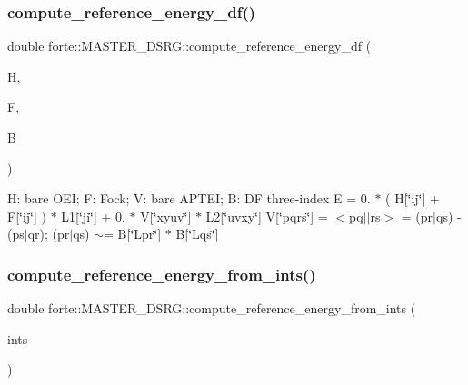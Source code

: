 \subsubsection{\texorpdfstring{compute\+\_\+reference\+\_\+energy\+\_\+df()}{compute\_reference\_energy\_df()}}
{\footnotesize\ttfamily double forte\+::\+M\+A\+S\+T\+E\+R\+\_\+\+D\+S\+R\+G\+::compute\+\_\+reference\+\_\+energy\+\_\+df (\begin{DoxyParamCaption}\item[{Blocked\+Tensor}]{H,  }\item[{Blocked\+Tensor}]{F,  }\item[{Blocked\+Tensor}]{B }\end{DoxyParamCaption})\hspace{0.3cm}{\ttfamily [protected]}}

H\+: bare O\+EI; F\+: Fock; V\+: bare A\+P\+T\+EI; B\+: DF three-\/index E = 0. $\ast$ ( H\mbox{[}\char`\"{}ij\char`\"{}\mbox{]} + F\mbox{[}\char`\"{}ij\char`\"{}\mbox{]} ) $\ast$ L1\mbox{[}\char`\"{}ji\char`\"{}\mbox{]} + 0. $\ast$ V\mbox{[}\char`\"{}xyuv\char`\"{}\mbox{]} $\ast$ L2\mbox{[}\char`\"{}uvxy\char`\"{}\mbox{]} V\mbox{[}\char`\"{}pqrs\char`\"{}\mbox{]} = $<$pq$\vert$$\vert$rs$>$ = (pr$\vert$qs) -\/ (ps$\vert$qr); (pr$\vert$qs) $\sim$= B\mbox{[}\char`\"{}\+Lpr\char`\"{}\mbox{]} $\ast$ B\mbox{[}\char`\"{}\+Lqs\char`\"{}\mbox{]} \mbox{\label{classforte_1_1_m_a_s_t_e_r___d_s_r_g_a2dd2a66d680e50beb52cb3651f1f994d}} 
\subsubsection{\texorpdfstring{compute\+\_\+reference\+\_\+energy\+\_\+from\+\_\+ints()}{compute\_reference\_energy\_from\_ints()}}
{\footnotesize\ttfamily double forte\+::\+M\+A\+S\+T\+E\+R\+\_\+\+D\+S\+R\+G\+::compute\+\_\+reference\+\_\+energy\+\_\+from\+\_\+ints (\begin{DoxyParamCaption}\item[{std\+::shared\+\_\+ptr$<$ \mbox{\hyperlink{classforte_1_1_forte_integrals}{Forte\+Integrals}} $>$}]{ints }\end{DoxyParamCaption})\hspace{0.3cm}{\ttfamily [protected]}}



